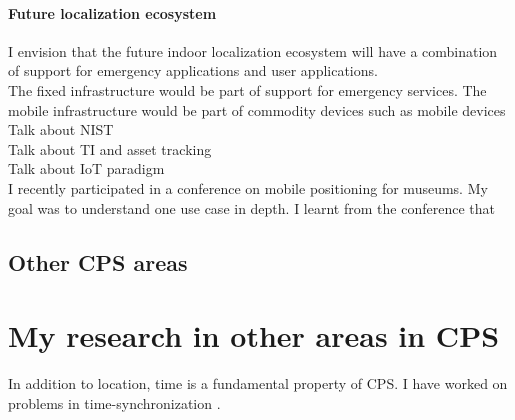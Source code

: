 \documentclass[10pt]{article}
\begin{document}

\paragraph{Future localization ecosystem}
I envision that the future indoor localization ecosystem will have a combination of support for emergency applications and user applications. \\
The fixed infrastructure would be part of support for emergency services. The mobile infrastructure would be part of commodity devices such as mobile devices\\
Talk about NIST\\
Talk about TI and asset tracking\\
Talk about IoT paradigm\\
I recently participated in a conference on mobile positioning for museums. My goal was to understand one use case in depth. I learnt from the conference that 


\subsection{Other CPS areas}

\section{My research in other areas in CPS}
In addition to location, time is a fundamental property of CPS. I have
worked on problems in time-synchronization \cite{buevich2013hardware,
  dongare2017pulsar, rtas-alps-platform}.

 
\end{document}

